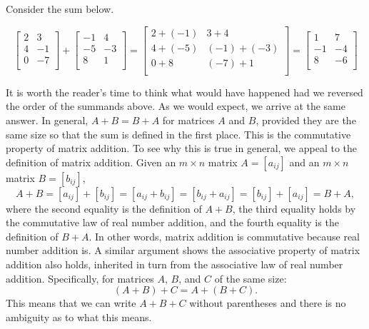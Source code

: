 \smallskip

Consider the sum below.

\[ \left[ \begin{array}{rr}2 & 3 \\ 4 & -1 \\ 0 & -7 \\ \end{array} \right] + \left[ \begin{array}{rr} -1 & 4 \\ -5 & -3 \\ 8 & 1 \\ \end{array} \right] = \left[ \begin{array}{rr} 2 + (-1) & 3+4 \\ 4+(-5) & (-1)+(-3) \\ 0+8 & (-7)+ 1 \\ \end{array} \right]  = \left[ \begin{array}{rr} 1 & 7 \\ -1 & -4 \\ 8 & -6 \\ \end{array} \right] \]



It is worth the reader's time to think what would have happened had we reversed the order of the summands above.  As we would expect, we arrive at the same answer.  In general, $A+B = B+A$ for matrices $A$ and $B$, provided they are the same size so that the sum is defined in the first place.  This is the   commutative property of matrix addition.  To see why this is true in general, we appeal to the definition of matrix addition.  Given an $m\times n$ matrix $A =\left[a_{ij}\right]$ and an $m\times n$ matrix $B =\left[b_{ij}\right]$, \[A + B = \left[a_{ij}\right] + \left[b_{ij}\right] = \left[ a_{ij} + b_{ij} \right] = \left[ b_{ij} + a_{ij} \right] = \left[b_{ij}\right] + \left[a_{ij}\right] =B+A,\] where the second equality is the definition of $A+B$, the third equality holds by the commutative law of real number addition, and the fourth equality is the definition of $B+A$.  In other words, matrix addition is commutative because real number addition is.  A similar argument shows the   associative property of matrix addition also holds, inherited in turn from the associative law of real number addition.  Specifically, for matrices $A$, $B$, and $C$ of the same size:
\[(A+B)+C = A+(B+C). \]  
This means that we can write $A+B+C$ without parentheses and there is no ambiguity as to what this means.


